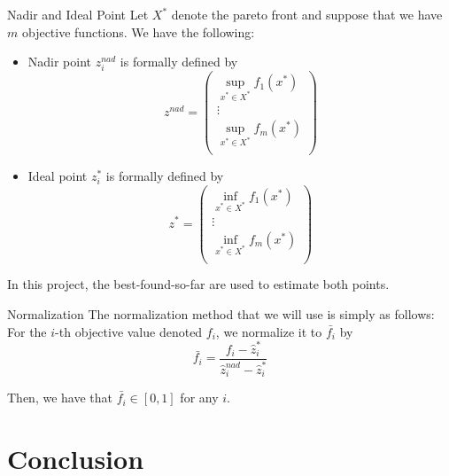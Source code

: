 \documentclass{beamer}
\begin{document}
\begin{frame}{Nadir and Ideal Point}
    Let \(X^*\) denote the pareto front and suppose that we have \(m\) objective functions. We have the following:
    \begin{itemize}
        \item Nadir point \(z_i^{nad}\) is formally defined by
            \[
                z^{nad} = \begin{pmatrix}
                    \sup_{x^* \in X^*} f_1(x^*) \\
                    \vdots \\
                    \sup_{x^* \in X^*} f_m(x^*) \\
                \end{pmatrix}
            \]
        \item Ideal point \(z_i^*\) is formally defined by
            \[
                z^{*} = \begin{pmatrix}
                    \inf_{x^* \in X^*} f_1(x^*) \\
                    \vdots \\
                    \inf_{x^* \in X^*} f_m(x^*) \\
                \end{pmatrix}
            \]
    \end{itemize}
    In this project, the best-found-so-far are used to estimate both points.
\end{frame}

\begin{frame}{Normalization}
    The normalization method that we will use is simply as follows: For the \(i\)-th objective value denoted \(f_i\), we normalize it to \(\bar{f_i}\) by
    \[
        \bar{f_i} = \frac{f_i - \hat{z}^*_i}{\hat{z}_i^{nad} - \hat{z}_i^*}
    \]

    Then, we have that \(\bar{f_i} \in [0, 1]\) for any \(i\).
\end{frame}

\section{Conclusion}
\end{document}
